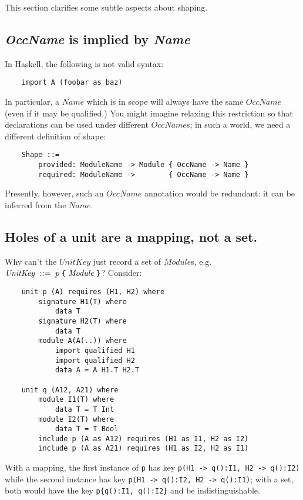 \documentclass{article}
\newcommand{\I}[1]{\ensuremath{\mathit{#1}}}
\begin{document}
This section clarifies some subtle aspects about shaping.

\subsection{\textit{OccName} is implied by \textit{Name}}
In Haskell, the following is not valid syntax:

\begin{verbatim}
    import A (foobar as baz)
\end{verbatim}
In particular, a \I{Name} which is in scope will always have the same
\I{OccName} (even if it may be qualified.)  You might imagine relaxing
this restriction so that declarations can be used under different \I{OccName}s;
in such a world, we need a different definition of shape:

\begin{verbatim}
    Shape ::=
        provided: ModuleName -> Module { OccName -> Name }
        required: ModuleName ->        { OccName -> Name }
\end{verbatim}
Presently, however, such an \I{OccName} annotation would be redundant: it can be inferred from the \I{Name}.

\subsection{Holes of a unit are a mapping, not a set.}

Why can't the \I{UnitKey} just record a
set of \I{Module}s, e.g. $\I{UnitKey}\;::= \; p \; \verb|{| \; \I{Module} \; \verb|}|$?  Consider:

\begin{verbatim}
    unit p (A) requires (H1, H2) where
        signature H1(T) where
            data T
        signature H2(T) where
            data T
        module A(A(..)) where
            import qualified H1
            import qualified H2
            data A = A H1.T H2.T

    unit q (A12, A21) where
        module I1(T) where
            data T = T Int
        module I2(T) where
            data T = T Bool
        include p (A as A12) requires (H1 as I1, H2 as I2)
        include p (A as A21) requires (H1 as I2, H2 as I1)
\end{verbatim}
With a mapping, the first instance of \verb|p| has key \verb|p(H1 -> q():I1, H2 -> q():I2)|
while the second instance has key \verb|p(H1 -> q():I2, H2 -> q():I1)|; with
a set, both would have the key \verb|p{q():I1, q():I2}| and be
indistinguishable.
\end{document}

